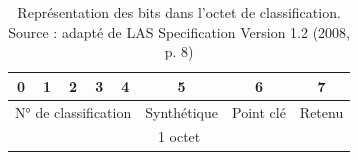 \begin{table}[!h]
\centering
\begin{tabular}{ccccclll}
\hline
\multicolumn{1}{|c|}{0} & \multicolumn{1}{c|}{1} & \multicolumn{1}{c|}{2} & \multicolumn{1}{c|}{3} & \multicolumn{1}{c|}{4} & \multicolumn{1}{c|}{5}           & \multicolumn{1}{c|}{6}         & \multicolumn{1}{c|}{7}      \\ \hline
\multicolumn{5}{|c|}{N° de classification}                                                                                  & \multicolumn{1}{l|}{Synthétique} & \multicolumn{1}{l|}{Point clé} & \multicolumn{1}{c|}{Retenu} \\ \hline
\multicolumn{8}{c}{1 octet}                                                                                                                                                                                                  
\end{tabular}
\caption{ Représentation des bits dans l'octet de classification. Source : adapté de LAS Specification Version 1.2 (2008, p. 8)}
\label{tab:las_class_byte_explanation}
\end{table}

